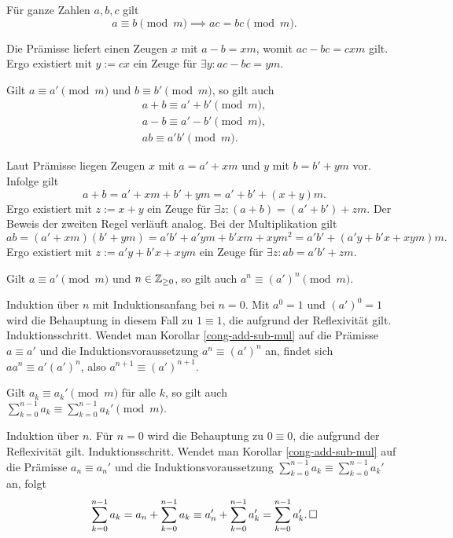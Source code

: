 \begin{Korollar}\label{cong-scale}
Für ganze Zahlen $a,b,c$ gilt
\[a\equiv b\pmod m\implies ac=bc\pmod m.\]
\end{Korollar}
\begin{Beweis} Die Prämisse liefert einen Zeugen $x$ mit
$a-b = xm$, womit $ac-bc = cxm$ gilt. Ergo existiert mit $y:=cx$ ein Zeuge
für $\exists y\colon ac-bc = ym$.\,\qedsymbol
\end{Beweis}

\begin{Korollar}\label{cong-add-sub-mul}
Gilt $a\equiv a'\pmod m$ und $b\equiv b'\pmod m$,
so gilt auch
\begin{gather*}
a+b\equiv a'+b'\pmod m,\\
a-b\equiv a'-b'\pmod m,\\
ab\equiv a'b'\pmod m.
\end{gather*}
\end{Korollar}
\begin{Beweis}
Laut Prämisse liegen Zeugen $x$ mit $a=a'+xm$ und $y$ mit $b=b'+ym$ vor.
Infolge gilt
\[a+b = a'+xm+b'+ym = a'+b'+(x+y)m.\]
Ergo existiert mit $z:=x+y$ ein Zeuge für
$\exists z\colon (a+b)=(a'+b')+zm$. Der Beweis der zweiten Regel
verläuft analog. Bei der Multiplikation gilt
\[ab = (a'+xm)(b'+ym) = a'b' + a'ym+b'xm + xym^2
= a'b' + (a'y+b'x+xym)m.\]
Ergo existiert mit $z:=a'y+b'x+xym$ ein Zeuge für
$\exists z\colon ab = a'b'+zm$.\,\qedsymbol
\end{Beweis}

\begin{Korollar}\label{cong-pow}
Gilt $a\equiv a'\pmod m$ und $n\in\mathbb Z_{\ge 0}$, so gilt auch
$a^n\equiv (a')^n\pmod m$.
\end{Korollar}
\begin{Beweis}
Induktion über $n$ mit Induktionsanfang bei $n=0$. Mit $a^0=1$ und
$(a')^0=1$ wird die Behauptung in diesem Fall zu $1\equiv 1$, die
aufgrund der Reflexivität gilt. Induktionsschritt.
Wendet man Korollar \ref{cong-add-sub-mul} auf die Prämisse
$a\equiv a'$ und die Induktionsvoraussetzung $a^n\equiv (a')^n$
an, findet sich $aa^n \equiv a'(a')^n$, also
$a^{n+1}\equiv (a')^{n+1}$.\,\qedsymbol
\end{Beweis}

\begin{Korollar}\label{cong-sum}
Gilt $a_k\equiv a_k'\pmod m$ für alle $k$, so gilt auch\\
$\sum_{k=0}^{n-1} a_k\equiv \sum_{k=0}^{n-1} a_k'\pmod m$.
\end{Korollar}
\begin{Beweis}
Induktion über $n$. Für $n=0$ wird die Behauptung zu $0\equiv 0$, die
aufgrund der Reflexivität gilt. Induktionsschritt. Wendet man Korollar
\ref{cong-add-sub-mul} auf die
Prämisse $a_n\equiv a_n'$ und die Induktionsvoraussetzung
$\sum_{k=0}^{n-1} a_k\equiv \sum_{k=0}^{n-1} a_k'$ an, folgt
\[\sum_{k=0}^{n-1} a_k = a_n + \sum_{k=0}^{n-1} a_k\equiv a_n' + \sum_{k=0}^{n-1} a_k'
= \sum_{k=0}^{n-1} a_k'.\,\square\]
\end{Beweis}

